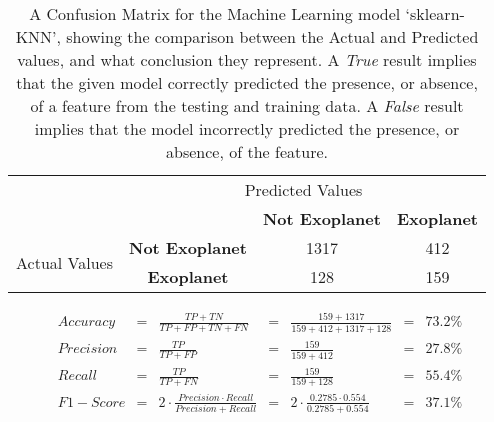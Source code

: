 
    \renewcommand{\arraystretch}{2}
    \renewcommand{\tabcolsep}{20.25pt}
    \vspace{-0.5cm}
    \begin{table}[ht]
    \begin{tabular}{cccc}
     & \multicolumn{3}{c}{Predicted Values} \\ \cline{3-4}
     & \multicolumn{1}{c|}{} & \multicolumn{1}{c|}{\textbf{Not Exoplanet}} & \multicolumn{1}{c|}{\textbf{Exoplanet}} \\ \cline{2-4}
    \multicolumn{1}{c|}{\multirow{2}{2.0cm}{Actual Values}} & \multicolumn{1}{c|}{\textbf{Not Exoplanet}} & \multicolumn{1}{c|}{1317} & \multicolumn{1}{c|}{412} \\ \cline{2-4}
    \multicolumn{1}{c|}{} & \multicolumn{1}{c|}{\textbf{Exoplanet}} & \multicolumn{1}{c|}{128} & \multicolumn{1}{c|}{159} \\ \cline{2-4}
    \end{tabular}
    \caption{A Confusion Matrix for the Machine Learning model `sklearn-KNN', showing the comparison between the Actual and Predicted values, and what conclusion they represent. A \emph{True} result implies that the given model correctly predicted the presence, or absence, of a feature from the testing and training data. A \emph{False} result implies that the model incorrectly predicted the presence, or absence, of the feature.}
    \label{tab:sklearn-KNNconfusionmatrix}
    \end{table}
    \vspace{-0.75cm}
    \label{eq:metrics-sklearn-KNN}
    \begin{align*}
        Accuracy &= &\frac{TP + TN}{TP + FP + TN + FN} &= &\frac{159 + 1317}{159 + 412 + 1317 + 128} &= & 73.2\% \\
        Precision &= &\frac{TP}{TP + FP} &= &\frac{159}{159 + 412} &= & 27.8\% \\
        Recall &= &\frac{TP}{TP + FN} &= &\frac{159}{159 + 128} &= & 55.4\% \\
        F1-Score &= &2 \cdot \frac{Precision \cdot Recall}{Precision + Recall} &= &2 \cdot \frac{0.2785 \cdot 0.554}{0.2785 + 0.554} &= & 37.1\% \\
    \end{align*}
    \vspace{-1.75cm}
    \renewcommand{\arraystretch}{1}
    \renewcommand{\tabcolsep}{5.25pt}
    